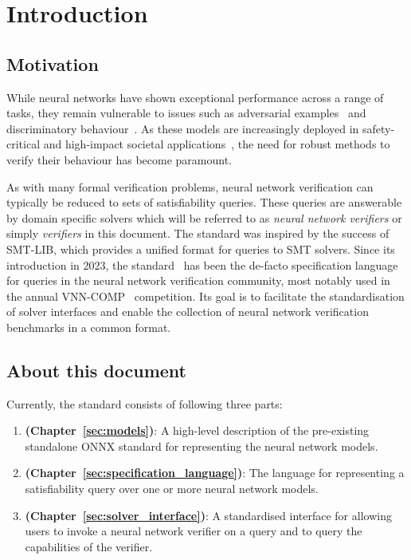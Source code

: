 \chapter{Introduction}
\label{sec:intro}

\section{Motivation}

While neural networks have shown exceptional performance across a range of tasks, 
they remain vulnerable to issues such as adversarial examples~\cite{szegedy2013intriguing} and discriminatory behaviour~\cite{4}. As these models are increasingly deployed in safety-critical and high-impact societal applications~\cite{1,2,3}, the need for robust methods to verify their behaviour has become paramount.

As with many formal verification problems, neural network verification can typically be reduced to sets of satisfiability queries. These queries are answerable by domain specific solvers which will be referred to as \emph{neural network verifiers} or simply \emph{verifiers} in this document. The \vnnlib{} standard was inspired by the success of SMT-LIB, which provides a unified format for queries to SMT solvers. 
Since its introduction in 2023, the \vnnlib{} standard~\cite{5} has been the de-facto specification language for queries in the neural network verification community, most notably used in the annual VNN-COMP~\cite{7} competition. Its goal is to facilitate the standardisation of solver interfaces and enable the collection of neural network verification benchmarks in a common format. 

\section{About this document}

Currently, the standard consists of following three parts:
\begin{enumerate}
\item \textbf{ (Chapter~\ref{sec:models})}: A high-level description of the pre-existing standalone ONNX standard for representing the neural network models.
\item \textbf{ (Chapter~\ref{sec:specification_language})}: The \vnnlib{} language for representing a satisfiability query over one or more neural network models.
\item \textbf{ (Chapter~\ref{sec:solver_interface})}: A standardised interface for allowing users to invoke a neural network verifier on a query and to query the capabilities of the verifier.
\end{enumerate}

